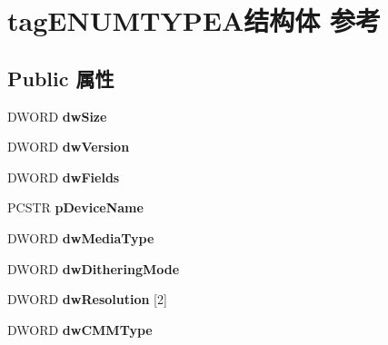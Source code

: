 \hypertarget{structtag_e_n_u_m_t_y_p_e_a}{}\section{tag\+E\+N\+U\+M\+T\+Y\+P\+E\+A结构体 参考}
\label{structtag_e_n_u_m_t_y_p_e_a}
\subsection*{Public 属性}
\begin{DoxyCompactItemize}
\item 
\mbox{\label{structtag_e_n_u_m_t_y_p_e_a_ac2685618c9f12f8155ded5d76eb4d57b}} 
D\+W\+O\+RD {\bfseries dw\+Size}
\item 
\mbox{\label{structtag_e_n_u_m_t_y_p_e_a_a78037768ecd0f62286a8727352726569}} 
D\+W\+O\+RD {\bfseries dw\+Version}
\item 
\mbox{\label{structtag_e_n_u_m_t_y_p_e_a_ac6a80ca080a2331243524a566a9f158e}} 
D\+W\+O\+RD {\bfseries dw\+Fields}
\item 
\mbox{\label{structtag_e_n_u_m_t_y_p_e_a_a05c8bbcbcdf6540cbac0413c01edc3af}} 
P\+C\+S\+TR {\bfseries p\+Device\+Name}
\item 
\mbox{\label{structtag_e_n_u_m_t_y_p_e_a_ad1dab531e970914caf7599046ca6cb4d}} 
D\+W\+O\+RD {\bfseries dw\+Media\+Type}
\item 
\mbox{\label{structtag_e_n_u_m_t_y_p_e_a_a57b6201613873c1f2bb550459dd103ec}} 
D\+W\+O\+RD {\bfseries dw\+Dithering\+Mode}
\item 
\mbox{\label{structtag_e_n_u_m_t_y_p_e_a_aa67595fb55dbb91f190d55b8c59a095c}} 
D\+W\+O\+RD {\bfseries dw\+Resolution} \mbox{[}2\mbox{]}
\item 
\mbox{\label{structtag_e_n_u_m_t_y_p_e_a_ab5be4eb2a5ef539df12591ff00e63e7a}} 
D\+W\+O\+RD {\bfseries dw\+C\+M\+M\+Type}
\item 
\mbox{\label{structtag_e_n_u_m_t_y_p_e_a_a8de3b086b0eef3063d151e8d2b077336}} 

\end{DoxyCompactItemize}
